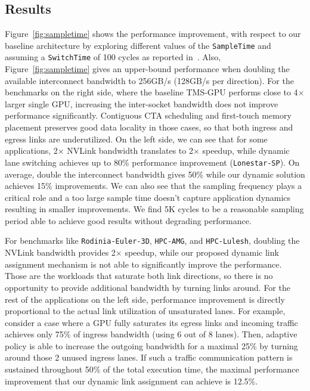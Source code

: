 \subsection{Results}
Figure~\ref{fig:sampletime} shows the performance improvement, with respect 
to our baseline architecture by exploring different values of the 
\texttt{SampleTime} and assuming a \texttt{SwitchTime} of 100 cycles as 
reported in~\cite{XXX}. Also, Figure~\ref{fig:sampletime} 
gives an upper-bound performance when doubling the available interconnect 
bandwidth to 256GB/s (128GB/s per direction). For the benchmarks on the right 
side, where the baseline TMS-GPU performs close to 4$\times$ larger single 
GPU, increasing the inter-socket bandwidth does not improve performance 
significantly. Contiguous CTA scheduling and first-touch memory placement 
preserves good data locality in those cases, so that both ingress and egress 
links are underutilized. On the left side, we can see that for some 
applications, 2$\times$ NVLink bandwidth translates to 2$\times$ speedup, 
while dynamic lane switching achieves up to 80\% performance improvement 
(\texttt{Lonestar-SP}). On average, double the interconnect bandwidth gives 
50\% while our dynamic solution achieves 15\% improvements. We can also see 
that the sampling frequency plays a critical role and a too large sample time 
doesn't capture application dynamics resulting in smaller improvements. We 
find 5K cycles to be a reasonable sampling period able to achieve good 
results without degrading performance.

For benchmarks like \texttt{Rodinia-Euler-3D}, \texttt{HPC-AMG}, and 
\texttt{HPC-Lulesh}, doubling the NVLink bandwidth provides 2$\times$ 
speedup, while our proposed dynamic link assignment mechanism is not 
able to significantly improve the performance. Those are the workloads 
that saturate both link directions, so there is no opportunity to 
provide additional bandwidth by turning links around. For the rest of 
the applications on the left side, performance improvement is directly 
proportional to the actual link utilization of unsaturated lanes. For 
example, consider a case where a GPU fully saturates its egress links 
and incoming traffic achieves only 75\% of ingress bandwidth (using 6 
out of 8 lanes). Then, adaptive policy is able to increase the outgoing 
bandwidth for a maximal 25\% by turning around those 2 unused ingress 
lanes. If such a traffic communication pattern is sustained throughout 
50\% of the total execution time, the maximal performance improvement 
that our dynamic link assignment can achieve is 12.5\%.

